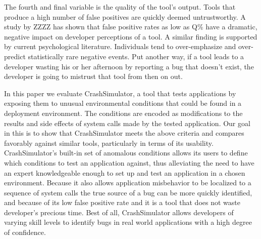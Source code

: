 The fourth and final variable is the quality of the tool's output.  Tools
that produce a high number of false positives are quickly deemed
untrustworthy.  A study by ZZZZ has shown that false positive rates as low
as Q\% have a dramatic, negative impact on developer perceptions of a tool.
  A similar finding is supported by current psychological
literature.  Individuals tend to over-emphasize and over-predict
statistically rare negative events.  Put another way, if a
tool leads to a developer wasting his or her afternoon by reporting a bug
that doesn't exist, the developer is going to mistrust that tool from then
on out.

%


In this paper we evaluate CrashSimulator, a tool that tests applications by
exposing them to unusual environmental conditions 
that could be found in a deployment environment.  The conditions are
encoded as modifications to the results and side effects of system calls
made by the tested application.
Our goal in this is to show that CrashSimulator meets the above
criteria and compares favorably against similar tools, particularly in
terms of its usability.  CrashSimulator's
built-in set of anomalous conditions allows its users to define which
conditions to test an application against, thus alleviating the need to
have an expert knowledgeable enough to set up and test an application in a
chosen environment.  Because it also allows
application misbehavior to be localized
to a sequence of system calls the true source of a bug can be more
quickly identified,
and because of its low false positive rate and it
is a tool that does not waste developer's precious time.
Best of all, CrashSimulator allows developers of varying skill levels to
identify bugs in real world applications with a high degree of confidence.

